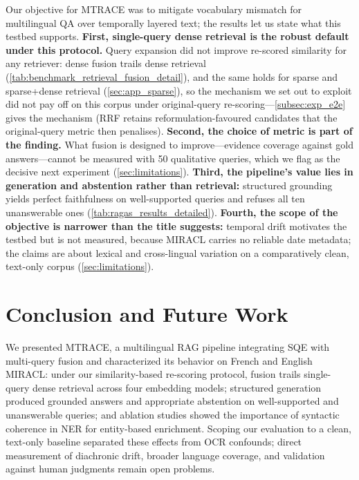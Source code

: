 \documentclass[11pt]{article}
\begin{document}
Our objective for MTRACE was to mitigate vocabulary mismatch for multilingual QA over temporally layered text; the results let us state what this testbed supports. \textbf{First, single-query dense retrieval is the robust default under this protocol.} Query expansion did not improve re-scored similarity for any retriever: dense fusion trails dense retrieval (\cref{tab:benchmark_retrieval_fusion_detail}), and the same holds for sparse and sparse+dense retrieval (\cref{sec:app_sparse}), so the mechanism we set out to exploit did not pay off on this corpus under original-query re-scoring---\cref{subsec:exp_e2e} gives the mechanism (RRF retains reformulation-favoured candidates that the original-query metric then penalises). \textbf{Second, the choice of metric is part of the finding.} What fusion is designed to improve---evidence coverage against gold answers---cannot be measured with 50 qualitative queries, which we flag as the decisive next experiment (\cref{sec:limitations}). \textbf{Third, the pipeline's value lies in generation and abstention rather than retrieval:} structured grounding yields perfect faithfulness on well-supported queries and refuses all ten unanswerable ones (\cref{tab:ragas_results_detailed}). \textbf{Fourth, the scope of the objective is narrower than the title suggests:} temporal drift motivates the testbed but is not measured, because MIRACL carries no reliable date metadata; the claims are about lexical and cross-lingual variation on a comparatively clean, text-only corpus (\cref{sec:limitations}).

\section{Conclusion and Future Work}
\label{sec:conclusion}

We presented MTRACE, a multilingual RAG pipeline integrating SQE with multi-query fusion and characterized its behavior on French and English MIRACL: under our similarity-based re-scoring protocol, fusion trails single-query dense retrieval across four embedding models; structured generation produced grounded answers and appropriate abstention on well-supported and unanswerable queries; and ablation studies showed the importance of syntactic coherence in NER for entity-based enrichment. Scoping our evaluation to a clean, text-only baseline separated these effects from OCR confounds; direct measurement of diachronic drift, broader language coverage, and validation against human judgments remain open problems.
\end{document}
